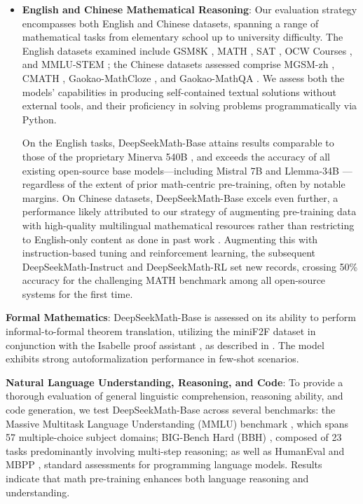 \begin{itemize}[topsep=0pt]
    \item \textbf{English and Chinese Mathematical Reasoning}: Our evaluation strategy encompasses both English and Chinese datasets, spanning a range of mathematical tasks from elementary school up to university difficulty. The English datasets examined include GSM8K \citep{gsm8k}, MATH \citep{MATH}, SAT \citep{llemma}, OCW Courses \citep{minerva}, and MMLU-STEM \citep{mmlu}; the Chinese datasets assessed comprise MGSM-zh \citep{mgsm}, CMATH \citep{wei2023cmath}, Gaokao-MathCloze \citep{agieval}, and Gaokao-MathQA \citep{agieval}. We assess both the models' capabilities in producing self-contained textual solutions without external tools, and their proficiency in solving problems programmatically via Python.

    On the English tasks, DeepSeekMath-Base attains results comparable to those of the proprietary Minerva 540B \citep{minerva}, and exceeds the accuracy of all existing open-source base models—including Mistral 7B \citep{mistral} and Llemma-34B \citep{llemma}—regardless of the extent of prior math-centric pre-training, often by notable margins. On Chinese datasets, DeepSeekMath-Base excels even further, a performance likely attributed to our strategy of augmenting pre-training data with high-quality multilingual mathematical resources rather than restricting to English-only content as done in past work \citep{minerva,llemma}. Augmenting this with instruction-based tuning and reinforcement learning, the subsequent DeepSeekMath-Instruct and DeepSeekMath-RL set new records, crossing 50\% accuracy for the challenging MATH benchmark among all open-source systems for the first time.
\end{itemize}

\item \textbf{Formal Mathematics}: DeepSeekMath-Base is assessed on its ability to perform informal-to-formal theorem translation, utilizing the miniF2F dataset \citep{minif2f} in conjunction with the Isabelle proof assistant \citep{isabelle}, as described in \citep{dsp_proof}. The model exhibits strong autoformalization performance in few-shot scenarios.
\item \textbf{Natural Language Understanding, Reasoning, and Code}: To provide a thorough evaluation of general linguistic comprehension, reasoning ability, and code generation, we test DeepSeekMath-Base across several benchmarks: the Massive Multitask Language Understanding (MMLU) benchmark \citep{mmlu}, which spans 57 multiple-choice subject domains; BIG-Bench Hard (BBH) \citep{bbh}, composed of 23 tasks predominantly involving multi-step reasoning; as well as HumanEval \citep{codex} and MBPP \citep{mbpp}, standard assessments for programming language models. Results indicate that math pre-training enhances both language reasoning and understanding.

